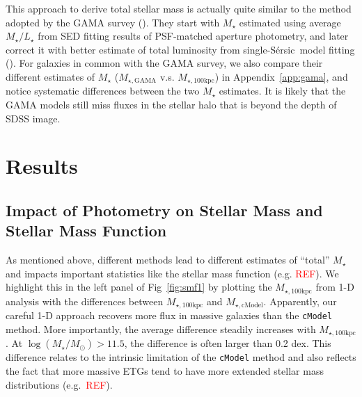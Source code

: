 \documentclass{emulateapj}
\def\ser{{S\'{e}rsic\ }}
\def\mstar{{$M_{\star}$}}
\def\logms{{$\log (M_{\star}/M_{\odot})$}}
\def\mtot{{$M_{\star,100\mathrm{kpc}}$}}
\def\mgama{{$M_{\star,\mathrm{GAMA}}$}}
\def\mcmodel{{$M_{\star,\mathrm{cModel}}$}}
\def\m2l{{$M_{\star}/L_{\star}$}}
\newcommand{\addref}{{\textcolor{red}{REF}}}
\begin{document}
\begin{CJK*}{UTF8}{gbsn}
    This approach to derive total stellar mass is actually quite similar to the 
    method adopted by the GAMA survey (\citealt{Taylor2011}).
    They start with \mstar{} estimated using average \m2l{} from SED fitting 
    results of PSF-matched aperture photometry, and later correct it with better 
    estimate of total luminosity from single-\ser model fitting
    (\citealt{Kelvin2012}). 
    For galaxies in common with the GAMA survey, we also compare their different 
    estimates of \mstar{} (\mgama{} v.s. \mtot{}) in Appendix~\ref{app:gama},  
    and notice systematic differences between the two \mstar{} estimates.
    It is likely that the GAMA models still miss fluxes in the stellar halo that 
    is beyond the depth of SDSS image. 
 
\section{Results}
    \label{sec:result}

    \subsection{Impact of Photometry on Stellar Mass and Stellar Mass Function}
    \label{ssec:s82}
    
    As mentioned above, different methods lead to different estimates of ``total'' 
    \mstar{} and impacts important statistics like the stellar mass function 
    (e.g. \addref{}).
    We highlight this in the left panel of Fig~\ref{fig:smf1} by plotting 
    the \mtot{} from 1-D analysis with the differences between \mtot{} and \mcmodel{}.
    Apparently, our careful 1-D approach recovers more flux in massive galaxies 
    than the \texttt{cModel} method. 
    More importantly, the average difference steadily increases with \mtot{}. 
    At \logms$>11.5$, the difference is often larger than 0.2 dex.  
    This difference relates to the intrinsic limitation of the \texttt{cModel} 
    method and also reflects the fact that more massive ETGs tend to have more 
    extended stellar mass distributions (e.g.\ \addref{}). 
     

\end{CJK*}
\end{document}
